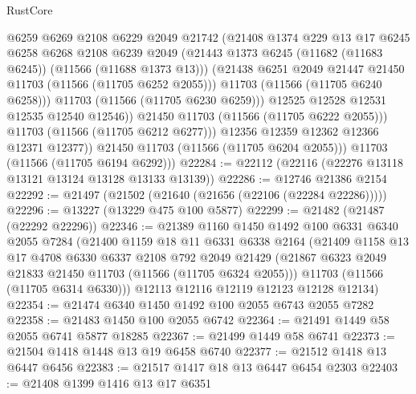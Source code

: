 \begin{lexlean}{RustCore}
\begin{coremodule}
                      @6259
                      @6269
                      @2108
                      @6229
                      @2049
                      @21742
                      (@21408
                        @1374
                        @229
                        @13
                        @17
                        @6245
                        @6258
                        @6268
                        @2108
                        @6239
                        @2049
                        (@21443 @1373 @6245 (@11682 (@11683 @6245)) (@11566 (@11688 @1373 @13)))
                        (@21438 @6251 @2049 @21447 @21450 @11703 (@11566 (@11705 @6252 @2055)))
                        @11703
                        (@11566 (@11705 @6240 @6258)))
                      @11703
                      (@11566 (@11705 @6230 @6259)))
                    @12525
                    @12528
                    @12531
                    @12535
                    @12540
                    @12546))
                @21450
                @11703
                (@11566 (@11705 @6222 @2055)))
              @11703
              (@11566 (@11705 @6212 @6277)))
            @12356
            @12359
            @12362
            @12366
            @12371
            @12377))
        @21450
        @11703
        (@11566 (@11705 @6204 @2055)))
      @11703
      (@11566 (@11705 @6194 @6292)))
@22284 := @22112 (@22116 (@22276 @13118 @13121 @13124 @13128 @13133 @13139))
@22286 := @12746 @21386 @2154
@22292 := @21497 (@21502 (@21640 (@21656 (@22106 (@22284 @22286)))))
@22296 := @13227 (@13229 @475 @100 @5877)
@22299 := @21482 (@21487 (@22292 @22296))
@22346 := @21389
    @1160
    @1450
    @1492
    @100
    @6331
    @6340
    @2055
    @7284
    (@21400
      @1159
      @18
      @11
      @6331
      @6338
      @2164
      (@21409
        @1158
        @13
        @17
        @4708
        @6330
        @6337
        @2108
        @792
        @2049
        @21429
        (@21867 @6323 @2049 @21833 @21450 @11703 (@11566 (@11705 @6324 @2055)))
        @11703
        (@11566 (@11705 @6314 @6330)))
      @12113
      @12116
      @12119
      @12123
      @12128
      @12134)
@22354 := @21474 @6340 @1450 @1492 @100 @2055 @6743 @2055 @7282
@22358 := @21483 @1450 @100 @2055 @6742
@22364 := @21491 @1449 @58 @2055 @6741 @5877 @18285
@22367 := @21499 @1449 @58 @6741
@22373 := @21504 @1418 @1448 @13 @19 @6458 @6740
@22377 := @21512 @1418 @13 @6447 @6456
@22383 := @21517 @1417 @18 @13 @6447 @6454 @2303
@22403 := @21408
    @1399
    @1416
    @13
    @17
    @6351

\end{coremodule}
\end{lexlean}
